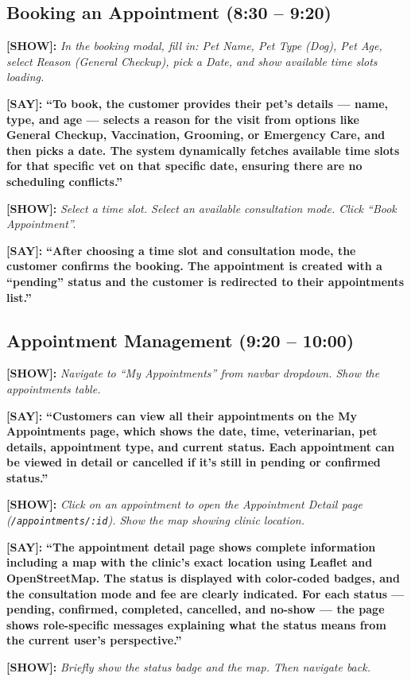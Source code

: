\documentclass[12pt,a4paper]{article}
\newcommand{\say}[1]{\textbf{\textcolor{narration}{[SAY]:}} \textbf{``#1''}}
\newcommand{\show}[1]{\textbf{\textcolor{screen}{[SHOW]:}} \textit{#1}}
\begin{document}
\subsection{Booking an Appointment (8:30 -- 9:20)}

\show{In the booking modal, fill in: Pet Name, Pet Type (Dog), Pet Age, select Reason (General Checkup), pick a Date, and show available time slots loading.}

\say{To book, the customer provides their pet's details --- name, type, and age --- selects a reason for the visit from options like General Checkup, Vaccination, Grooming, or Emergency Care, and then picks a date. The system dynamically fetches available time slots for that specific vet on that specific date, ensuring there are no scheduling conflicts.}

\show{Select a time slot. Select an available consultation mode. Click ``Book Appointment''.}

\say{After choosing a time slot and consultation mode, the customer confirms the booking. The appointment is created with a ``pending'' status and the customer is redirected to their appointments list.}

\subsection{Appointment Management (9:20 -- 10:00)}

\show{Navigate to ``My Appointments'' from navbar dropdown. Show the appointments table.}

\say{Customers can view all their appointments on the My Appointments page, which shows the date, time, veterinarian, pet details, appointment type, and current status. Each appointment can be viewed in detail or cancelled if it's still in pending or confirmed status.}

\show{Click on an appointment to open the Appointment Detail page (\texttt{/appointments/:id}). Show the map showing clinic location.}

\say{The appointment detail page shows complete information including a map with the clinic's exact location using Leaflet and OpenStreetMap. The status is displayed with color-coded badges, and the consultation mode and fee are clearly indicated. For each status --- pending, confirmed, completed, cancelled, and no-show --- the page shows role-specific messages explaining what the status means from the current user's perspective.}

\show{Briefly show the status badge and the map. Then navigate back.}
\end{document}
